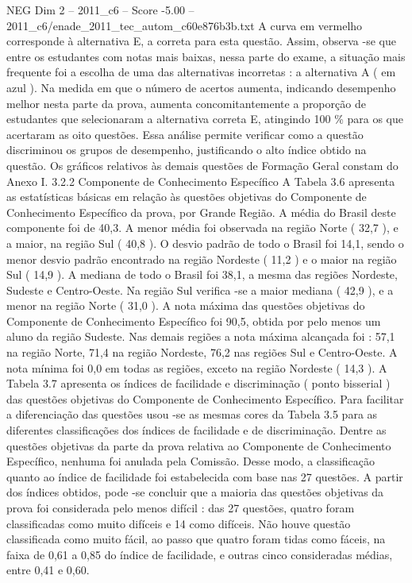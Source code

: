 \begin{textsample}{NEG Dim 2 – 2011\_c6 – Score -5.00 – 2011\_c6/enade\_2011\_tec\_autom\_c60e876b3b.txt}
A curva em vermelho corresponde à alternativa E, a correta para esta questão.
Assim, observa -se que entre os estudantes com notas mais baixas, nessa parte do exame, a situação mais frequente foi a escolha de uma das alternativas incorretas : a alternativa A ( em azul ).
Na medida em que o número de acertos aumenta, indicando desempenho melhor nesta parte da prova, aumenta concomitantemente a proporção de estudantes que selecionaram a alternativa correta E, atingindo 100 \% para os que acertaram as oito questões.
Essa análise permite verificar como a questão discriminou os grupos de desempenho, justificando o alto índice obtido na questão.
Os gráficos relativos às demais questões de Formação Geral constam do Anexo I. 3.2.2 Componente de Conhecimento Específico A Tabela 3.6 apresenta as estatísticas básicas em relação às questões objetivas do Componente de Conhecimento Específico da prova, por Grande Região.
A média do Brasil deste componente foi de 40,3.
A menor média foi observada na região Norte ( 32,7 ), e a maior, na região Sul ( 40,8 ).
O desvio padrão de todo o Brasil foi 14,1, sendo o menor desvio padrão encontrado na região Nordeste ( 11,2 ) e o maior na região Sul ( 14,9 ).
A mediana de todo o Brasil foi 38,1, a mesma das regiões Nordeste, Sudeste e Centro-Oeste.
Na região Sul verifica -se a maior mediana ( 42,9 ), e a menor na região Norte ( 31,0 ).
A nota máxima das questões objetivas do Componente de Conhecimento Específico foi 90,5, obtida por pelo menos um aluno da região Sudeste.
Nas demais regiões a nota máxima alcançada foi : 57,1 na região Norte, 71,4 na região Nordeste, 76,2 nas regiões Sul e Centro-Oeste.
A nota mínima foi 0,0 em todas as regiões, exceto na região Nordeste ( 14,3 ).
A Tabela 3.7 apresenta os índices de facilidade e discriminação ( ponto bisserial ) das questões objetivas do Componente de Conhecimento Específico.
Para facilitar a diferenciação das questões usou -se as mesmas cores da Tabela 3.5 para as diferentes classificações dos índices de facilidade e de discriminação.
Dentre as questões objetivas da parte da prova relativa ao Componente de Conhecimento Específico, nenhuma foi anulada pela Comissão.
Desse modo, a classificação quanto ao índice de facilidade foi estabelecida com base nas 27 questões.
A partir dos índices obtidos, pode -se concluir que a maioria das questões objetivas da prova foi considerada pelo menos difícil : das 27 questões, quatro foram classificadas como muito difíceis e 14 como difíceis.
Não houve questão classificada como muito fácil, ao passo que quatro foram tidas como fáceis, na faixa de 0,61 a 0,85 do índice de facilidade, e outras cinco consideradas médias, entre 0,41 e 0,60.

\end{textsample}
